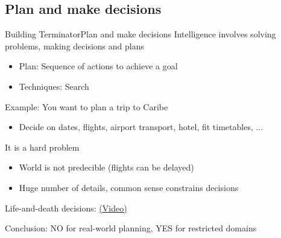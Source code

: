 \documentclass[10pt,compress]{beamer} %
\begin{document}
%

\subsection{Plan and make decisions}

\begin{frame}{Building Terminator}{Plan and make decisions}
	Intelligence involves solving problems, making decisions and plans
	\begin{itemize}
		\item Plan: Sequence of actions to achieve a goal
		\item Techniques: Search
	\end{itemize}

	Example: You want to plan a trip to Caribe
	\begin{itemize}
		\item Decide on dates, flights, airport transport, hotel, fit timetables, ...
	\end{itemize}

	It is a hard problem
	\begin{itemize}
		\item World is not predecible (flights can be delayed)
		\item Huge number of details, common sense constrains decisions
	\end{itemize}

	Life-and-death decisions: \href{https://www.youtube.com/watch?v=ixIoDYVfKA0}{(Video)}

	Conclusion: NO for real-world planning, YES for restricted domains
\end{frame}
\end{document}
